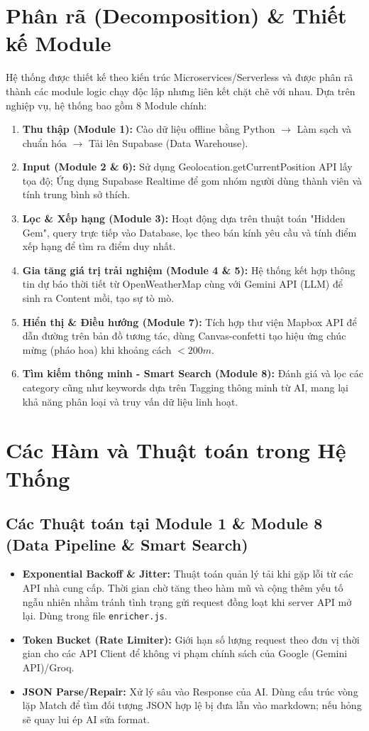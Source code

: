 \documentclass[12pt]{article}
\begin{document}
\section{Phân rã (Decomposition) \& Thiết kế Module}
Hệ thống được thiết kế theo kiến trúc Microservices/Serverless và được phân rã thành các module logic chạy độc lập nhưng liên kết chặt chẽ với nhau. Dựa trên nghiệp vụ, hệ thống bao gồm 8 Module chính:
\begin{enumerate}
    \item \textbf{Thu thập (Module 1):} Cào dữ liệu offline bằng Python $\rightarrow$ Làm sạch và chuẩn hóa $\rightarrow$ Tải lên Supabase (Data Warehouse).
    \item \textbf{Input (Module 2 \& 6):} Sử dụng Geolocation.getCurrentPosition API lấy tọa độ; Ứng dụng Supabase Realtime để gom nhóm người dùng thành viên và tính trung bình sở thích.
    \item \textbf{Lọc \& Xếp hạng (Module 3):} Hoạt động dựa trên thuật toán "Hidden Gem", query trực tiếp vào Database, lọc theo bán kính yêu cầu và tính điểm xếp hạng để tìm ra điểm duy nhất.
    \item \textbf{Gia tăng giá trị trải nghiệm (Module 4 \& 5):} Hệ thống kết hợp thông tin dự báo thời tiết từ OpenWeatherMap cùng với Gemini API (LLM) để sinh ra Content mồi, tạo sự tò mò.
    \item \textbf{Hiển thị \& Điều hướng (Module 7):} Tích hợp thư viện Mapbox API để dẫn đường trên bản đồ tương tác, dùng Canvas-confetti tạo hiệu ứng chúc mừng (pháo hoa) khi khoảng cách $< 200m$.
    \item \textbf{Tìm kiếm thông minh - Smart Search (Module 8):} Đánh giá và lọc các category cũng như keywords dựa trên Tagging thông minh từ AI, mang lại khả năng phân loại và truy vấn dữ liệu linh hoạt.
\end{enumerate}

\section{Các Hàm và Thuật toán trong Hệ Thống}
\subsection{Các Thuật toán tại Module 1 \& Module 8 (Data Pipeline \& Smart Search)}
\begin{itemize}
    \item \textbf{Exponential Backoff \& Jitter:} Thuật toán quản lý tải khi gặp lỗi từ các API nhà cung cấp. Thời gian chờ tăng theo hàm mũ và cộng thêm yếu tố ngẫu nhiên nhằm tránh tình trạng gửi request đồng loạt khi server API mở lại. Dùng trong file \texttt{enricher.js}.
    \item \textbf{Token Bucket (Rate Limiter):} Giới hạn số lượng request theo đơn vị thời gian cho các API Client để không vi phạm chính sách của Google (Gemini API)/Groq.
    \item \textbf{JSON Parse/Repair:} Xử lý sâu vào Response của AI. Dùng cấu trúc vòng lặp Match để tìm đối tượng JSON hợp lệ bị đưa lẫn vào markdown; nếu hỏng sẽ quay lui ép AI sửa format.
\end{itemize}
\end{document}
